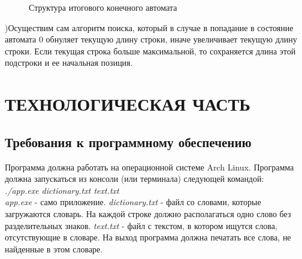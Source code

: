 \documentclass[a4paper,12pt]{article}
\begin{document}
\begin{figure}[H]
\caption{Структура итогового конечного автомата}
\label{images:automat3}
\end{figure}
)Осуществим сам алгоритм поиска, который в случае в попадание в состояние автомата 0 обнуляет текущую длину строки, иначе увеличивает текущую длину строки. Если текущая строка больше максимальной, то сохраняется длина этой подстроки и ее начальная позиция.

\newpage
\section{ТЕХНОЛОГИЧЕСКАЯ ЧАСТЬ}
\subsection{Требования к программному обеспечению}
Программа должна работать на операционной системе Arch Linux. 
Программа должна запускаться из консоли (или терминала) следующей командой:\\
\textit{./app.exe dictionary.txt text.txt} \\
\textit{app.exe} - само приложение. \textit{dictionary.txt} - файл со словами, которые загружаются словарь. На каждой строке должно располагаться одно слово без разделительных знаков. \textit{text.txt} - файл с текстом, в котором ищутся слова, отсутствующие в словаре.
На выход программа должна печатать все слова, не найденные в этом словаре.
\end{document}
